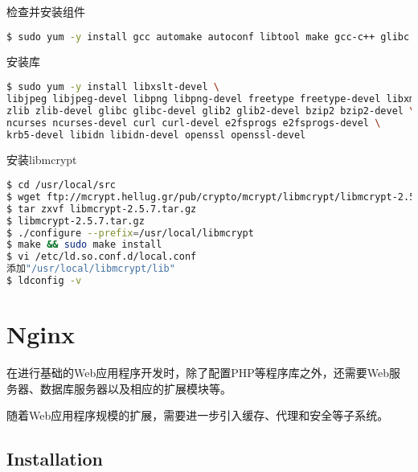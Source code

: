 \begin{lstlisting}[language=bash]

\end{lstlisting}




\begin{lstlisting}[language=bash]

\end{lstlisting}





检查并安装组件


\begin{lstlisting}[language=bash]
$ sudo yum -y install gcc automake autoconf libtool make gcc-c++ glibc
\end{lstlisting}

安装库


\begin{lstlisting}[language=bash]
$ sudo yum -y install libxslt-devel \
libjpeg libjpeg-devel libpng libpng-devel freetype freetype-devel libxml2 libxml2-devel \
zlib zlib-devel glibc glibc-devel glib2 glib2-devel bzip2 bzip2-devel \
ncurses ncurses-devel curl curl-devel e2fsprogs e2fsprogs-devel \
krb5-devel libidn libidn-devel openssl openssl-devel
\end{lstlisting}

安装libmcrypt


\begin{lstlisting}[language=bash]
$ cd /usr/local/src
$ wget ftp://mcrypt.hellug.gr/pub/crypto/mcrypt/libmcrypt/libmcrypt-2.5.7.tar.gz
$ tar zxvf libmcrypt-2.5.7.tar.gz
$ libmcrypt-2.5.7.tar.gz
$ ./configure --prefix=/usr/local/libmcrypt
$ make && sudo make install
$ vi /etc/ld.so.conf.d/local.conf
添加"/usr/local/libmcrypt/lib"
$ ldconfig -v
\end{lstlisting}





\section{Nginx}



在进行基础的Web应用程序开发时，除了配置PHP等程序库之外，还需要Web服务器、数据库服务器以及相应的扩展模块等。

随着Web应用程序规模的扩展，需要进一步引入缓存、代理和安全等子系统。




\subsection{Installation}


